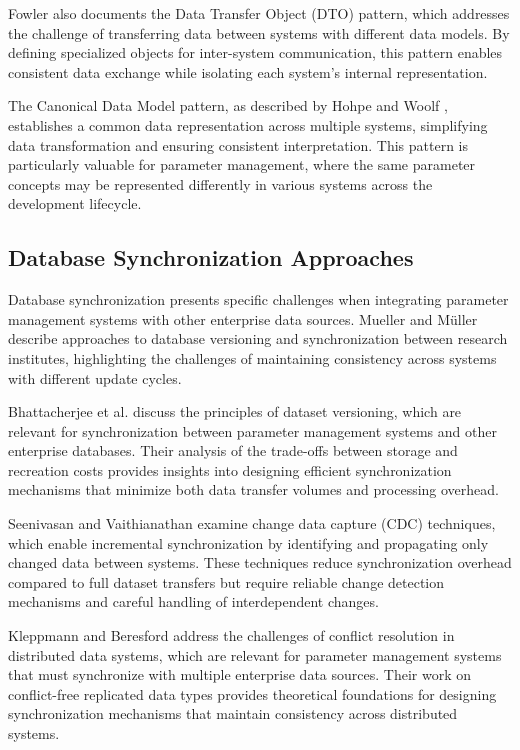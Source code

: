 Fowler \cite{fowler2003patterns} also documents the Data Transfer Object (DTO) pattern, which addresses the challenge of transferring data between systems with different data models. By defining specialized objects for inter-system communication, this pattern enables consistent data exchange while isolating each system's internal representation.

The Canonical Data Model pattern, as described by Hohpe and Woolf \cite{hohpe2002enterprise}, establishes a common data representation across multiple systems, simplifying data transformation and ensuring consistent interpretation. This pattern is particularly valuable for parameter management, where the same parameter concepts may be represented differently in various systems across the development lifecycle.

\subsection{Database Synchronization Approaches}
\label{subsec:database-synchronization}

Database synchronization presents specific challenges when integrating parameter management systems with other enterprise data sources. Mueller and Müller \cite{mueller2018conception} describe approaches to database versioning and synchronization between research institutes, highlighting the challenges of maintaining consistency across systems with different update cycles.

Bhattacherjee et al. \cite{bhattacherjee2015principles} discuss the principles of dataset versioning, which are relevant for synchronization between parameter management systems and other enterprise databases. Their analysis of the trade-offs between storage and recreation costs provides insights into designing efficient synchronization mechanisms that minimize both data transfer volumes and processing overhead.

Seenivasan and Vaithianathan \cite{seenivasan2023real} examine change data capture (CDC) techniques, which enable incremental synchronization by identifying and propagating only changed data between systems. These techniques reduce synchronization overhead compared to full dataset transfers but require reliable change detection mechanisms and careful handling of interdependent changes.

Kleppmann and Beresford \cite{kleppmann2017conflict} address the challenges of conflict resolution in distributed data systems, which are relevant for parameter management systems that must synchronize with multiple enterprise data sources. Their work on conflict-free replicated data types provides theoretical foundations for designing synchronization mechanisms that maintain consistency across distributed systems.

